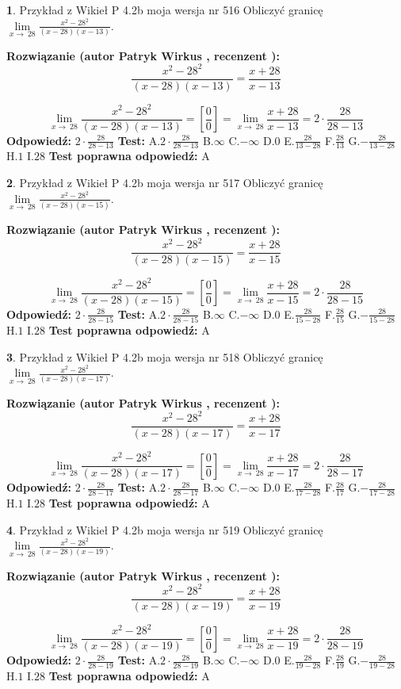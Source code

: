 \documentclass[12pt, a4paper]{article}
\theoremstyle{definition} %
\newtheorem{zad}{}
\newcommand{\zadStart}[1]{\begin{zad}#1\newline}
\newcommand{\zadStop}{\end{zad}}
\newcommand{\rozwStart}[2]{\noindent \textbf{Rozwiązanie (autor #1 , recenzent #2): }\newline}
\newcommand{\rozwStop}{\newline}
\newcommand{\odpStart}{\noindent \textbf{Odpowiedź:}\newline}
\newcommand{\odpStop}{\newline}
\newcommand{\testStart}{\noindent \textbf{Test:}\newline}
\newcommand{\testStop}{\newline}
\newcommand{\kluczStart}{\noindent \textbf{Test poprawna odpowiedź:}\newline}
\newcommand{\kluczStop}{\newline}
\begin{document}
\zadStart{Przykład z Wikieł P 4.2b moja wersja nr 516}
Obliczyć granicę $\lim\limits_{x\to\ 28}\frac{x^{2}-28^{2}}{(x-28)(x-13)}$.
\zadStop
\rozwStart{Patryk Wirkus}{}
$$\frac{x^{2}-28^{2}}{(x-28)(x-13)}=\frac{x+28}{x-13}$$

$$\lim\limits_{x\to\ 28}\frac{x^{2}-28^{2}}{(x-28)(x-13)}=[\frac{0}{0}]=\lim\limits_{x\to\ 28}\frac{x+28}{x-13}=2 \cdot \frac{28}{28-13}$$
\rozwStop
\odpStart
$2 \cdot \frac{28}{28-13}$
\odpStop
\testStart
A.$2 \cdot \frac{28}{28-13}$
B.$\infty$
C.$-\infty$
D.$0$
E.$\frac{28}{13-28}$
F.$\frac{28}{13}$
G.$-\frac{28}{13-28}$
H.$1$
I.$28$
\testStop
\kluczStart
A
\kluczStop



\zadStart{Przykład z Wikieł P 4.2b moja wersja nr 517}
Obliczyć granicę $\lim\limits_{x\to\ 28}\frac{x^{2}-28^{2}}{(x-28)(x-15)}$.
\zadStop
\rozwStart{Patryk Wirkus}{}
$$\frac{x^{2}-28^{2}}{(x-28)(x-15)}=\frac{x+28}{x-15}$$

$$\lim\limits_{x\to\ 28}\frac{x^{2}-28^{2}}{(x-28)(x-15)}=[\frac{0}{0}]=\lim\limits_{x\to\ 28}\frac{x+28}{x-15}=2 \cdot \frac{28}{28-15}$$
\rozwStop
\odpStart
$2 \cdot \frac{28}{28-15}$
\odpStop
\testStart
A.$2 \cdot \frac{28}{28-15}$
B.$\infty$
C.$-\infty$
D.$0$
E.$\frac{28}{15-28}$
F.$\frac{28}{15}$
G.$-\frac{28}{15-28}$
H.$1$
I.$28$
\testStop
\kluczStart
A
\kluczStop



\zadStart{Przykład z Wikieł P 4.2b moja wersja nr 518}
Obliczyć granicę $\lim\limits_{x\to\ 28}\frac{x^{2}-28^{2}}{(x-28)(x-17)}$.
\zadStop
\rozwStart{Patryk Wirkus}{}
$$\frac{x^{2}-28^{2}}{(x-28)(x-17)}=\frac{x+28}{x-17}$$

$$\lim\limits_{x\to\ 28}\frac{x^{2}-28^{2}}{(x-28)(x-17)}=[\frac{0}{0}]=\lim\limits_{x\to\ 28}\frac{x+28}{x-17}=2 \cdot \frac{28}{28-17}$$
\rozwStop
\odpStart
$2 \cdot \frac{28}{28-17}$
\odpStop
\testStart
A.$2 \cdot \frac{28}{28-17}$
B.$\infty$
C.$-\infty$
D.$0$
E.$\frac{28}{17-28}$
F.$\frac{28}{17}$
G.$-\frac{28}{17-28}$
H.$1$
I.$28$
\testStop
\kluczStart
A
\kluczStop



\zadStart{Przykład z Wikieł P 4.2b moja wersja nr 519}
Obliczyć granicę $\lim\limits_{x\to\ 28}\frac{x^{2}-28^{2}}{(x-28)(x-19)}$.
\zadStop
\rozwStart{Patryk Wirkus}{}
$$\frac{x^{2}-28^{2}}{(x-28)(x-19)}=\frac{x+28}{x-19}$$

$$\lim\limits_{x\to\ 28}\frac{x^{2}-28^{2}}{(x-28)(x-19)}=[\frac{0}{0}]=\lim\limits_{x\to\ 28}\frac{x+28}{x-19}=2 \cdot \frac{28}{28-19}$$
\rozwStop
\odpStart
$2 \cdot \frac{28}{28-19}$
\odpStop
\testStart
A.$2 \cdot \frac{28}{28-19}$
B.$\infty$
C.$-\infty$
D.$0$
E.$\frac{28}{19-28}$
F.$\frac{28}{19}$
G.$-\frac{28}{19-28}$
H.$1$
I.$28$
\testStop
\kluczStart
A
\kluczStop
\end{document}
